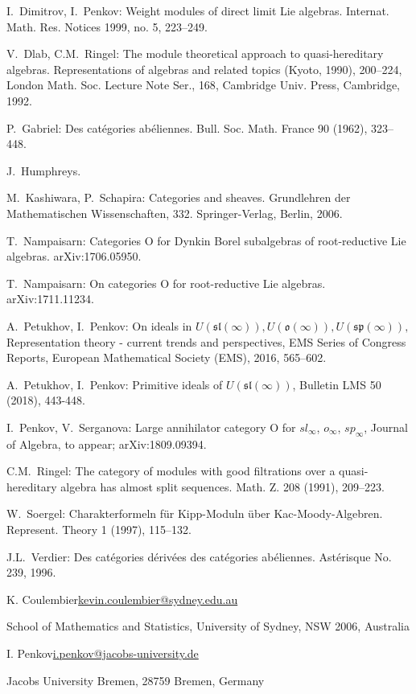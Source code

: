\documentclass[11pt]{amsart}
\numberwithin{equation}{section}
\theoremstyle{plain}
\theoremstyle{remark}
\theoremstyle{remark}
\theoremstyle{construction}
\begin{document}
\begin{thebibliography}
I.~Dimitrov, I.~Penkov: Weight modules of direct limit Lie algebras. Internat. Math. Res. Notices 1999, no. 5, 223--249.

V.~Dlab, C.M.~Ringel:
The module theoretical approach to quasi-hereditary algebras. Representations of algebras and related topics (Kyoto, 1990), 200--224, 
London Math. Soc. Lecture Note Ser., { 168}, Cambridge Univ. Press, Cambridge, 1992.


P.~Gabriel:
Des cat\'egories ab\'eliennes. 
Bull. Soc. Math. France 90 (1962), 323--448.

J.~Humphreys.


 M.~Kashiwara, P.~Schapira:
Categories and sheaves. 
Grundlehren der Mathematischen Wissenschaften, 332. Springer-Verlag, Berlin, 2006.


	T.~Nampaisarn: Categories O for Dynkin Borel subalgebras of root-reductive Lie algebras. arXiv:1706.05950.
	
	T.~Nampaisarn: On categories O for root-reductive Lie algebras.  arXiv:1711.11234.


	


	A.~Petukhov, I.~Penkov: On ideals in $U(\mathfrak{sl}(\infty)), U(\mathfrak{o}(\infty)), U(\mathfrak{sp}(\infty)),$ Representation theory - current trends and perspectives, EMS Series of Congress Reports, European Mathematical Society (EMS), 2016, 565--602.


	A.~Petukhov, I.~Penkov: Primitive ideals of $U(\mathfrak{sl}(\infty))$, Bulletin LMS 50 (2018), 443-448.
	
 I.~Penkov, V.~Serganova: Large annihilator category O for $sl_{\infty}$, $o_{\infty}$, $sp_{\infty}$, {Journal of Algebra, to appear;}  arXiv:1809.09394.

C.M.~Ringel:
The category of modules with good filtrations over a quasi-hereditary algebra has almost split sequences. 
Math. Z. {208} (1991), 209--223. 




	W.~Soergel:
Charakterformeln f\"ur Kipp-Moduln \"uber Kac-Moody-Algebren. Represent. Theory 1 (1997), 115--132. 


J.L.~Verdier:
Des cat\'egories d\'eriv\'ees des cat\'egories ab\'eliennes.
Ast\'erisque No. {239}, 1996. 



\end{thebibliography}


\begin{flushleft}
	K. Coulembier\qquad \url{kevin.coulembier@sydney.edu.au}
	
	School of Mathematics and Statistics, University of Sydney, NSW 2006, Australia
	
	\vspace{2mm}
	
	I. Penkov\qquad \url{i.penkov@jacobs-university.de}


Jacobs University Bremen, 28759 Bremen, Germany
\end{flushleft}
\end{document}
